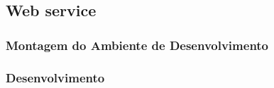 			\subsection{Web service}	
				
	
						\subsubsection{Montagem do Ambiente de Desenvolvimento}
							
	
						\subsubsection{Desenvolvimento}
							

